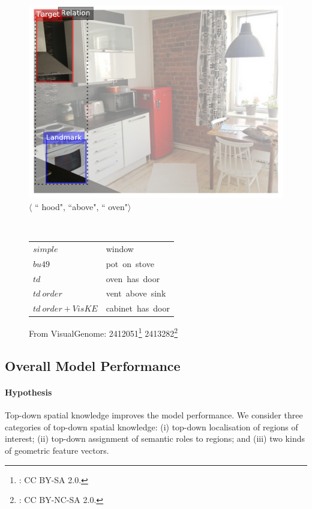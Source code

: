 \begin{figure}[ht!]
\begin{minipage}{0.55\linewidth}
\begin{minipage}{\columnwidth}
			\includegraphics[width=\columnwidth]{studies/inlg2019/figures/2413282_hood_above_oven.pdf} \\
			$\langle$ ``{\color{red} hood}", ``above", ``{\color{blue} oven}"$\rangle$ \\
		\end{minipage} \\
		\begin{minipage}{\columnwidth}%
			\small
			\begin{tabular}{ll}
			$simple$         & {window} \\
			$bu49$           & {pot~on~stove} \\
			$td$             & {oven~has~door} \\
			$td~order$       & {vent~above~sink} \\
			$td~order+VisKE$ & {cabinet~has~door} \\
			\hline
			\end{tabular}
		\end{minipage}
	\end{minipage}
	\caption{From VisualGenome: 
	2412051\protect\footnote{\citet{vg2412051}: CC BY-SA 2.0.}
	2413282\protect\footnote{\citet{vg2413282}: CC BY-NC-SA 2.0.}
	}\label{inlg2019:fig:data_example2}
\end{figure}


\subsection{Overall Model Performance}
\paragraph{Hypothesis}
Top-down spatial knowledge improves the model performance.  We
consider three categories of top-down spatial knowledge: (i) top-down
localisation of regions of interest; (ii) top-down assignment of
semantic roles to regions; and (iii) two kinds of geometric feature
vectors.



